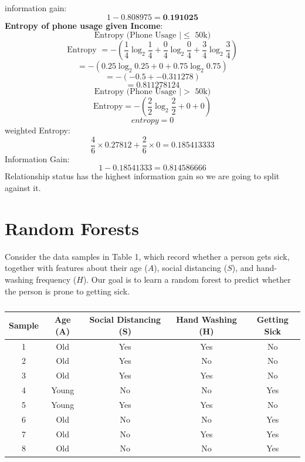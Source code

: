 \documentclass[a3paper,12pt]{extarticle} %
\begin{document}
\begin{enumerate}
\[        \]
        information gain:
        \[
            1 - 0.808975 = \textbf{0.191025}
        \]
        \textbf{Entropy of phone usage given Income}:
        \[
            \text{Entropy (Phone Usage $\mid \leq$ 50k)}  
        \]
        \[
            \text{Entropy } = - \left(\frac{1}{4} \log_2 \frac{1}{4} + \frac{0}{4} \log_2 \frac{0}{4} + \frac{3}{4} \log_2 \frac{3}{4}\right)
        \]
        \[
            = -\left(0.25 \log_2 0.25 + 0 + 0.75 \log_2 0.75\right)
        \]
        \[
            = -\left(-0.5 + -0.311278\right)
        \]
        \[
            = 0.811278124
        \]
        \[
            \text{Entropy (Phone Usage $\mid >$ 50k)}  
        \]
        \[
            \text{Entropy} = -\left(\frac{2}{2} \log_2 \frac{2}{2} + 0 + 0\right)
        \]
        \[
            entropy = 0
        \]
        weighted Entropy:
        \[
            \frac{4}{6} \times 0.27812 + \frac{2}{6} \times 0 = 0.185413333
        \]
        Information Gain:
        \[
        1 - 0.18541333 = 0.814586666
        \]
        Relationship status has the highest information gain so we are going to split against it.



\end{enumerate}

\newpage
\section{Random Forests}
Consider the data samples in Table 1, which record whether a person gets sick, together with features about their age ($A$), social distancing ($S$), and hand-washing frequency ($H$). Our goal is to learn a random forest to predict whether the person is prone to getting sick.
\begin{table}[h!]
    \centering
    \begin{tabular}{|c|c|c|c|c|}
    \hline
    \textbf{Sample} & \textbf{Age (A)} & \textbf{Social Distancing (S)} & \textbf{Hand Washing (H)} & \textbf{Getting Sick} \\ \hline
    1 & Old & Yes & Yes & No \\ \hline
    2 & Old & Yes & No & No \\ \hline
    3 & Old & Yes & Yes & No \\ \hline
    4 & Young & No & No & Yes \\ \hline
    5 & Young & Yes & Yes & No \\ \hline
    6 & Old & No & No & Yes \\ \hline
    7 & Old & No & Yes & Yes \\ \hline
    8 & Old & No & No & Yes \\ \hline
    \end{tabular}
    \caption{}
    \label{table:data}
    \end{table}
\end{document}
